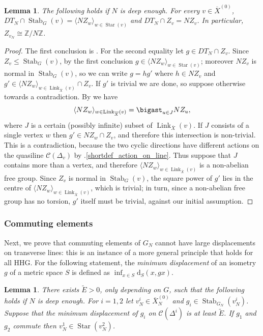 \documentclass[svgnames]{amsart}
\theoremstyle{plain}
\newtheorem{lem}[thm]{Lemma}
\theoremstyle{definition}
\newcommand{\C}[1]{\mathcal{C}(#1)}
\newcommand{\dist}{\mathrm{d}}
\newcommand{\link}[2]{\operatorname{Link}_{#1}\left(#2\right)}
\newcommand{\CStar}[1]{\operatorname{Star}\left(#1\right)}
\newcommand{\Z}{\mathbb{Z}}
\newcommand{\Stab}[2]{\operatorname{Stab}_{#1}\left(#2\right)}
\newcommand{\ov}[1]{\overline{#1}}
\begin{document}
\begin{lem}\label{lem:order_of_dt_in_shortquot} The following holds if $N$ is deep enough. For every $v\in \ov X^{(0)}$, $DT_N\cap \Stab{G}{v}=\langle NZ_w\rangle_{w\in \CStar{v}}$ and $DT_N\cap Z_v=NZ_v$. In particular, $Z_{v_N}\cong \Z/N\Z$.
\end{lem}

\begin{proof}
    The first conclusion is \cite[Corollary 3.36]{short_HHG:II}. For the second equality let $g\in DT_N\cap Z_v$. Since $Z_v\le \Stab{G}{v}$, by the first conclusion $g\in \langle NZ_w\rangle_{w\in \CStar{v}}$; moreover $NZ_v$ is normal in $\Stab{G}{v}$, so we can write $g=hg'$ where $h\in NZ_v$ and $g'\in  \langle NZ_w\rangle_{w\in \link{\ov X}{v}}\cap Z_v$. If $g'$ is trivial we are done, so suppose otherwise towards a contradiction. By \cite[Corollary 3.37]{short_HHG:II} we have $$\langle NZ_w\rangle_{w\in \link{\ov X}{v}}=\bigast_{u\in J}NZ_u,$$
    where $J$ is a certain (possibly infinite) subset of $\link{\ov X}{v}$. If $J$ consists of a single vertex $w$ then $g'\in NZ_w\cap Z_v$, and therefore this intersection is non-trivial. This is a contradiction, because the two cyclic directions have different actions on the quasiline $\C{\Delta_v}$ by .\eqref{shortdef_action_on_line}. Thus suppose that $J$ contains more than a vertex, and therefore $\langle NZ_w\rangle_{w\in \link{\ov X}{v}}$ is a non-abelian free group. Since $Z_v$ is normal in $\Stab{G}{v}$, the square power of $g'$ lies in the centre of $\langle NZ_w\rangle_{w\in \link{\ov X}{v}}$, which is trivial; in turn, since a non-abelian free group has no torsion, $g'$ itself must be trivial, against our initial assumption.
\end{proof}


\subsubsection{Commuting elements}
Next, we prove that commuting elements of $G_N$ cannot have large displacements on transverse lines: this is an instance of a more general principle that holds for all HHG. For the following statement, the \emph{minimum displacement} of an isometry $g$ of a metric space $S$ is defined as $\inf_{x\in S}\dist_S(x,gx)$.
\begin{lem}\label{lem:mindispl_and_commutation}
    There exists $\widetilde{E}> 0$, only depending on $G$, such that the following holds if $N$ is deep enough. For $i=1,2$ let $v_N^i\in \ov X_N^{(0)}$ and $g_i\in \Stab{G_N}{v^i_N}$. Suppose that the minimum displacement of $g_i$ on $\C{\Delta^i}$ is at least $\widetilde{E}$. If $g_1$ and $g_2$ commute then $v^1_N\in \CStar{v^2_N}$.
\end{lem}
\end{document}
